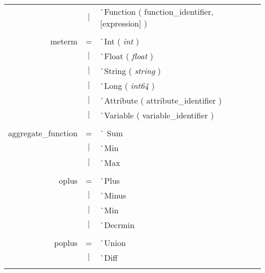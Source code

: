 \documentclass{article}
\begin{document}
\begin{tabular}[ht] {rcl}
&$\lvert$ & \`{}Function ( function\_identifier, [expression] )\\
\\
meterm &=& \`{}Int ( \emph{int} )\\
&$\lvert$ & \`{}Float ( \emph{float} )\\
&$\lvert$ & \`{}String ( \emph{string} )\\
&$\lvert$ & \`{}Long ( \emph{int64} )\\
&$\lvert$ & \`{}Attribute ( attribute\_identifier )\\
&$\lvert$ & \`{}Variable ( variable\_identifier )\\
\\
aggregate\_function &=& \`{} Sum\\
&$\lvert$ & \`{}Min \\
&$\lvert$ & \`{}Max \\
\\
oplus &=& \`{}Plus \\
&$\lvert$ & \`{}Minus \\
&$\lvert$ & \`{}Min\\
&$\lvert$ & \`{}Decrmin\\
\\
poplus &=& \`{}Union\\
&$\lvert$ & \`{}Diff\\
\\
\end{tabular}
\pagebreak
\end{document}
